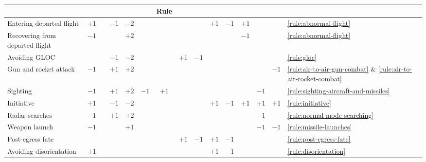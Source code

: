 \begin{twocolumntablefloat}
\begin{twocolumntable}
{\begin{tabularx}{1.0\linewidth}{l*{13}{C}l}
&&
&&&
&Rule\\
\midrule
Entering departed flight        &$+1$&    &$-1$&$-2$&     &     &    &     &$+1$&$-1$&$+1$ &    &    
&\ref{rule:abnormal-flight}\\
Recovering from departed flight &$-1$&    &    &$+2$&     &     &    &     &    &    &$-1$ &    &    
&\ref{rule:abnormal-flight}\\
Avoiding GLOC                   &    &    &$-1$&$-2$&     &     &$+1$&$-1$ &    &    &     &    &    
&\ref{rule:gloc}\\
Gun and rocket attack           &$-1$&    &$+1$&$+2$&     &     &    &     &    &    &     &    &$-1$
&\ref{rule:air-to-air-gun-combat} \& \ref{rule:air-to-air-rocket-combat}\\
Sighting                        &$-1$&    &$+1$&$+2$& $-1$&$+1$ &    &     &    &    &     &$-1$&    
&\ref{rule:sighting-aircraft-and-missiles}\\
Initiative                      &$+1$&    &$-1$&$-2$&     &     &    &     &$+1$&$-1$& $+1$&$+1$&$+1$
&\ref{rule:initiative}\\
Radar searches                  &$-1$&    &$+1$&$+2$&     &     &    &     &    &    &     &$-1$&    
&\ref{rule:normal-mode-searching}\\
Weapon launch                   &$-1$&    &    &$+1$&     &     &    &     &    &    &     &$-1$&$-1$
&\ref{rule:missile-launches}\\
Post-egress fate                &    &    &    &    &     &     &$+1$&$-1$ &$+1$&$-1$&     &    &    
&\ref{rule:post-egress-fate}\\
Avoiding disorientation         &$+1$&    &    &     &    &     &    &     &$+1$&$-1$&     &    &    
&\ref{rule:disorientation}\\
\bottomrule
\end{tabularx}
}
\end{twocolumntable}
\end{twocolumntablefloat}